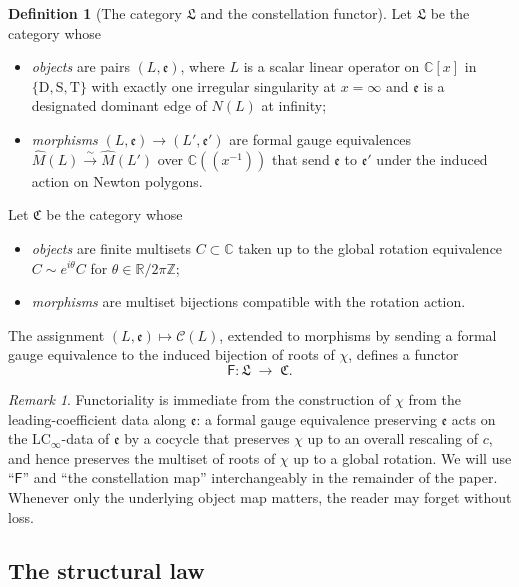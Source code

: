 \documentclass[11pt,a4paper]{article}
\theoremstyle{plain}
\theoremstyle{definition}
\newtheorem{definition}[theorem]{Definition}
\theoremstyle{remark}
\newtheorem{remark}[theorem]{Remark}
\newcommand{\opD}{\mathrm{D}}                     %
\newcommand{\opS}{\mathrm{S}}                     %
\newcommand{\opT}{\mathrm{T}}                     %
\newcommand{\LCinf}{\mathrm{LC}_\infty}
\newcommand{\NL}{N(L)}
\newcommand{\Cl}{\mathcal{C}}
\newcommand{\Fclass}{\mathsf{F}}
\begin{document}
\begin{definition}[The category $\mathfrak{L}$ and the constellation
functor]\label{def:F-functor}
Let $\mathfrak{L}$ be the category whose
\begin{itemize}[leftmargin=2em]
\item \emph{objects} are pairs $(L, \mathfrak{e})$, where $L$ is a
scalar linear operator on $\mathbb{C}[x]$ in $\{\opD, \opS, \opT\}$
with exactly one irregular singularity at $x = \infty$ and
$\mathfrak{e}$ is a designated dominant edge of $\NL$ at infinity;
\item \emph{morphisms} $(L, \mathfrak{e}) \to (L', \mathfrak{e}')$
are formal gauge equivalences $\widehat{M}(L) \xrightarrow{\sim}
\widehat{M}(L')$ over $\mathbb{C}((x^{-1}))$ that send
$\mathfrak{e}$ to $\mathfrak{e}'$ under the induced action on Newton
polygons.
\end{itemize}
Let $\mathfrak{C}$ be the category whose
\begin{itemize}[leftmargin=2em]
\item \emph{objects} are finite multisets $C \subset \mathbb{C}$
taken up to the global rotation equivalence
$C \sim e^{i\theta} C$ for $\theta \in \mathbb{R}/2\pi\mathbb{Z}$;
\item \emph{morphisms} are multiset bijections compatible with the
rotation action.
\end{itemize}
The assignment $(L, \mathfrak{e}) \mapsto \Cl(L)$, extended to morphisms
by sending a formal gauge equivalence to the induced bijection of
roots of $\chi$, defines a functor
\[
   \Fclass \colon \mathfrak{L} \;\longrightarrow\; \mathfrak{C}.
\]
\end{definition}

\begin{remark}\label{rem:F-functoriality}
Functoriality is immediate from the construction of $\chi$ from the
leading-coefficient data along $\mathfrak{e}$: a formal gauge
equivalence preserving $\mathfrak{e}$ acts on the $\LCinf$-data of
$\mathfrak{e}$ by a cocycle that preserves $\chi$ up to an overall
rescaling of $c$, and hence preserves the multiset of roots of $\chi$
up to a global rotation. We will use ``$\Fclass$'' and ``the
constellation map'' interchangeably in the remainder of the paper.
Whenever only the underlying object map matters, the reader may
forget  without loss.
\end{remark}

\subsection{The structural law}\label{ssec:intro-law}
\end{document}
